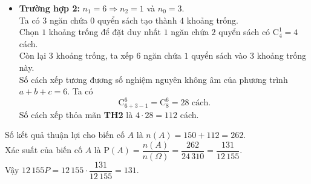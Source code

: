 \begin{ex}
{\begin{itemize}
			\item \textbf{Trường hợp 2:} $n_1 = 6 \Rightarrow n_2 = 1$ và $n_0 = 3$. \\
			Ta có $3$ ngăn chứa $0$ quyển sách tạo thành $4$ khoảng trống. \\
			Chọn $1$ khoảng trống để đặt duy nhất $1$ ngăn chứa $2$ quyển sách có $\mathrm{C}_4^1 = 4$ cách. \\
			Còn lại $3$ khoảng trống, ta xếp $6$ ngăn chứa $1$ quyển sách vào $3$ khoảng trống này. \\
			Số cách xếp tương đương số nghiệm nguyên không âm của phương trình $a+b+c=6$. Ta có $$\mathrm{C}_{6+3-1}^6 = \mathrm{C}_8^6 = 28 \text{ cách}.$$ 
			Số cách xếp thỏa mãn \textbf{TH2} là $4 \cdot 28 = 112$ cách.
		\end{itemize}
		Số kết quả thuận lợi cho biến cố $A$ là $n(A) = 150 + 112 = 262$. \\
		Xác suất của biến cố $A$ là $\mathrm{P}(A) = \dfrac{n(A)}{n(\Omega)} = \dfrac{262}{24\,310} = \dfrac{131}{12\,155}$. \\
		Vậy $12\,155P = 12\,155 \cdot \dfrac{131}{12\,155} = 131$.
	}
\end{ex}

